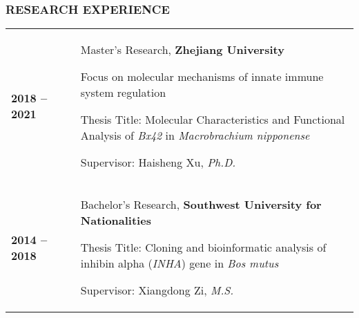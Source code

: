 \documentclass[12pt]{article}
\begin{document}
\vspace{0.5cm}


\subsubsection*{RESEARCH EXPERIENCE}\label{Research Experience}

\renewcommand\arraystretch{1.5}\tabcolsep=0pt
\begin{longtable}{p{0.2\linewidth}p{0.8\linewidth}}

    \textbf{2018 -- 2021}     & Master's Research, \textbf{Zhejiang University} 
                              
                                Focus on molecular mechanisms of innate immune system regulation 
                              
                                Thesis Title: Molecular Characteristics and Functional Analysis of \textit{Bx42} in \textit{Macrobrachium nipponense} 
                              
                                Supervisor: Haisheng Xu, \textit{Ph.D.} \\
                                
    \textbf{2014 -- 2018}     & Bachelor's Research, \textbf{Southwest  University  for  Nationalities}
                              
                                Thesis Title: Cloning and bioinformatic analysis of inhibin alpha (\textit{INHA}) gene in \textit{Bos mutus} 
                              
                                Supervisor: Xiangdong Zi, \textit{M.S.} \\

\end{longtable}

\vspace{0.5cm}
\end{document}
